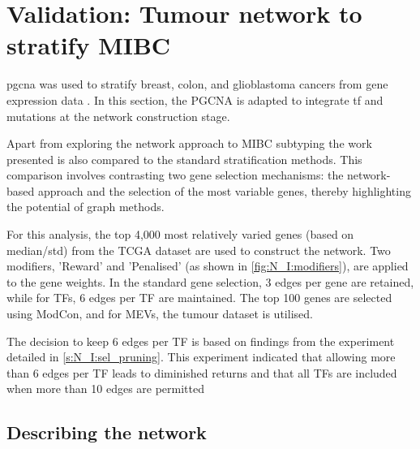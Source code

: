 \section{Validation: Tumour network to stratify MIBC} \label{s:N_I:tum}

\acrlong{pgcna} was used to stratify breast, colon, and glioblastoma cancers  from gene expression data \citet{Care2019-ij,Tanner2023-wa}. In this section, the PGCNA is adapted to integrate \acrfull{tf} and mutations at the network construction stage. 

Apart from exploring the network approach to MIBC subtyping the work presented is also compared to the standard stratification methods. This comparison involves contrasting two gene selection mechanisms: the network-based approach and the selection of the most variable genes, thereby highlighting the potential of graph methods.

For this analysis, the top 4,000 most relatively varied genes (based on median/std) from the TCGA dataset are used to construct the network. Two modifiers, 'Reward' and 'Penalised' (as shown in \cref{fig:N_I:modifiers}), are applied to the gene weights. In the standard gene selection, 3 edges per gene are retained, while for TFs, 6 edges per TF are maintained. The top 100 genes are selected using ModCon, and for MEVs, the tumour dataset is utilised.

The decision to keep 6 edges per TF is based on findings from the experiment detailed in \cref{s:N_I:sel_pruning}. This experiment indicated that allowing more than 6 edges per TF leads to diminished returns and that all TFs are included when more than 10 edges are permitted

\subsection{Describing the network} \label{s:N_I:tum_describe}



